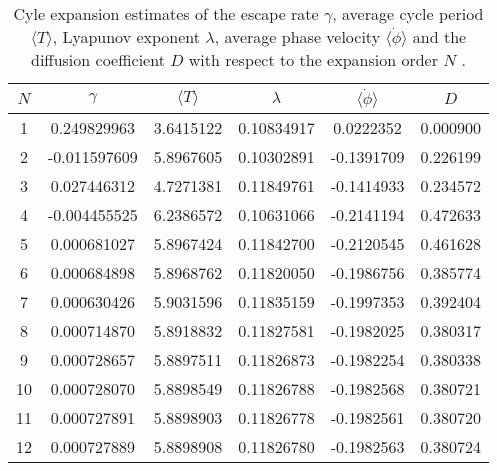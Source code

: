 \begin{table}
	\begin{tabular}{c|c|c|c|c|c}
	 $N$ & $\gamma$ & $\langle T \rangle$ & $\lambda$ & $\langle \dot{\phi} \rangle$ & $D$ \\ 
	\hline
	1 & 0.249829963 & 3.6415122 & 0.10834917 & 0.0222352 & 0.000900 \\ 
 	2 & -0.011597609 & 5.8967605 & 0.10302891 & -0.1391709 & 0.226199 \\ 
 	3 & 0.027446312 & 4.7271381 & 0.11849761 & -0.1414933 & 0.234572 \\ 
 	4 & -0.004455525 & 6.2386572 & 0.10631066 & -0.2141194 & 0.472633 \\ 
 	5 & 0.000681027 & 5.8967424 & 0.11842700 & -0.2120545 & 0.461628 \\ 
 	6 & 0.000684898 & 5.8968762 & 0.11820050 & -0.1986756 & 0.385774 \\ 
 	7 & 0.000630426 & 5.9031596 & 0.11835159 & -0.1997353 & 0.392404 \\ 
 	8 & 0.000714870 & 5.8918832 & 0.11827581 & -0.1982025 & 0.380317 \\ 
 	9 & 0.000728657 & 5.8897511 & 0.11826873 & -0.1982254 & 0.380338 \\ 
 	10 & 0.000728070 & 5.8898549 & 0.11826788 & -0.1982568 & 0.380721 \\ 
 	11 & 0.000727891 & 5.8898903 & 0.11826778 & -0.1982561 & 0.380720 \\ 
 	12 & 0.000727889 & 5.8898908 & 0.11826780 & -0.1982563 & 0.380724 \\ 
 	\end{tabular}
	\caption{Cyle expansion estimates of the escape rate $\gamma$, average cycle period $\langle T \rangle$, Lyapunov exponent $\lambda$, average phase velocity $\langle \dot{\phi} \rangle$ and the diffusion coefficient $D$ with respect to the expansion order $N$ .}
	\label{t-DynamicalAverages}
\end{table}
